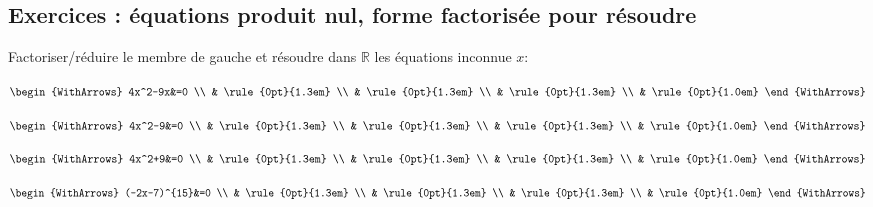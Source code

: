 \documentclass[main.tex]{subfiles}
\begin{document}
\newpage 
{}  
\pagestyle{scrheadings} %
\onehalfspacing
\subsection{Exercices : équations produit nul, forme factorisée pour résoudre}



\begin{example}  Factoriser/réduire le membre de gauche et résoudre dans $\mathbb{R}$ les équations inconnue $x$: 

\noindent  \parbox{0.24\linewidth}{	
$\begin{WithArrows}
4x^2-9x&=0 \\
&  \rule{0pt}{1.3em} \\
&   \rule{0pt}{1.3em}  \\
&    \rule{0pt}{1.3em}  \\
&   \rule{0pt}{1.0em}  
\end{WithArrows}$ 
}  \hfill \parbox{0.24\linewidth}{	
$\begin{WithArrows}
4x^2-9&=0 \\
&  \rule{0pt}{1.3em} \\
&   \rule{0pt}{1.3em}  \\
&   \rule{0pt}{1.3em}  \\
&   \rule{0pt}{1.0em}  
\end{WithArrows}$ 
}  \hfill \parbox{0.24\linewidth}{	
$\begin{WithArrows}
	4x^2+9&=0 \\
	&  \rule{0pt}{1.3em} \\
	&   \rule{0pt}{1.3em}  \\
	&   \rule{0pt}{1.3em}  \\
	&   \rule{0pt}{1.0em}  
\end{WithArrows}$ 
}    \hfill \parbox{0.24\linewidth}{	
$\begin{WithArrows}
(-2x-7)^{15}&=0 \\
&  \rule{0pt}{1.3em} \\
&   \rule{0pt}{1.3em}  \\
&   \rule{0pt}{1.3em}  \\
&   \rule{0pt}{1.0em}   
\end{WithArrows}$ 
}      




\end{example}
\end{document}
